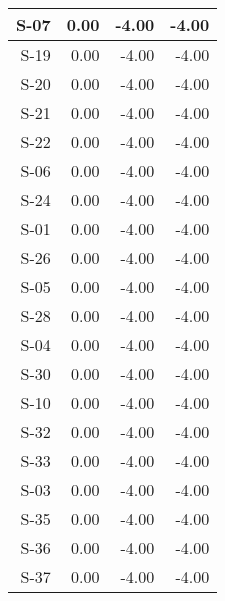 \begin{tabular}{ | r | r | r | r | }
    \hline
                  S-07  &            0.00  &           -4.00  &           -4.00  \\
    \hline
                  S-19  &            0.00  &           -4.00  &           -4.00  \\
    \hline
                  S-20  &            0.00  &           -4.00  &           -4.00  \\
    \hline
                  S-21  &            0.00  &           -4.00  &           -4.00  \\
    \hline
                  S-22  &            0.00  &           -4.00  &           -4.00  \\
    \hline
                  S-06  &            0.00  &           -4.00  &           -4.00  \\
    \hline
                  S-24  &            0.00  &           -4.00  &           -4.00  \\
    \hline
                  S-01  &            0.00  &           -4.00  &           -4.00  \\
    \hline
                  S-26  &            0.00  &           -4.00  &           -4.00  \\
    \hline
                  S-05  &            0.00  &           -4.00  &           -4.00  \\
    \hline
                  S-28  &            0.00  &           -4.00  &           -4.00  \\
    \hline
                  S-04  &            0.00  &           -4.00  &           -4.00  \\
    \hline
                  S-30  &            0.00  &           -4.00  &           -4.00  \\
    \hline
                  S-10  &            0.00  &           -4.00  &           -4.00  \\
    \hline
                  S-32  &            0.00  &           -4.00  &           -4.00  \\
    \hline
                  S-33  &            0.00  &           -4.00  &           -4.00  \\
    \hline
                  S-03  &            0.00  &           -4.00  &           -4.00  \\
    \hline
                  S-35  &            0.00  &           -4.00  &           -4.00  \\
    \hline
                  S-36  &            0.00  &           -4.00  &           -4.00  \\
    \hline
                  S-37  &            0.00  &           -4.00  &           -4.00  \\

\end{tabular}
